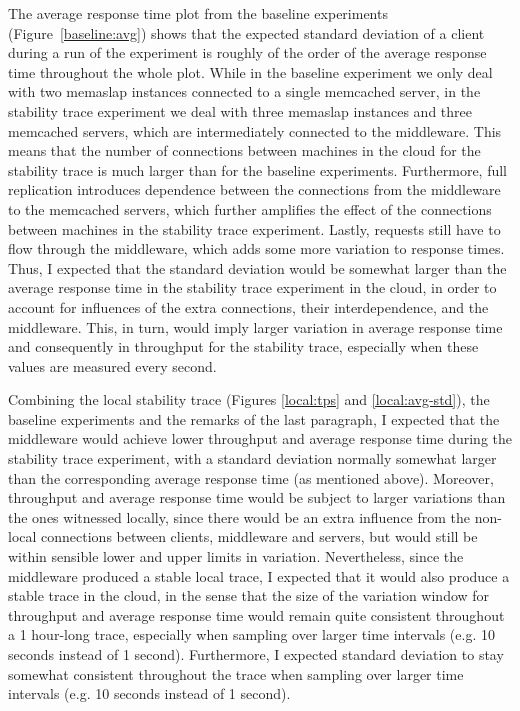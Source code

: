 \documentclass[11pt]{article}
\begin{document}
The average response time plot from the baseline experiments (Figure~\ref{baseline:avg}) shows that the expected standard deviation of a client during a run of the experiment is roughly of the order of the average response time throughout the whole plot. While in the baseline experiment we only deal with two memaslap instances connected to a single memcached server, in the stability trace experiment we deal with three memaslap instances and three memcached servers, which are intermediately connected to the middleware. This means that the number of connections between machines in the cloud for the stability trace is much larger than for the baseline experiments. Furthermore, full replication introduces dependence between the connections from the middleware to the memcached servers, which further amplifies the effect of the connections between machines in the stability trace experiment. Lastly, requests still have to flow through the middleware, which adds some more variation to response times. Thus, I expected that the standard deviation would be somewhat larger than the average response time in the stability trace experiment in the cloud, in order to account for influences of the extra connections, their interdependence, and the middleware. This, in turn, would imply larger variation in average response time and consequently in throughput for the stability trace, especially when these values are measured every second.

Combining the local stability trace (Figures \ref{local:tps} and \ref{local:avg-std}), the baseline experiments and the remarks of the last paragraph, I expected that the middleware would achieve lower throughput and average response time during the stability trace experiment, with a standard deviation normally somewhat larger than the corresponding average response time (as mentioned above). Moreover, throughput and average response time would be subject to larger variations than the ones witnessed locally, since there would be an extra influence from the non-local connections between clients, middleware and servers, but would still be within sensible lower and upper limits in variation. Nevertheless, since the middleware produced a stable local trace, I expected that it would also produce a stable trace in the cloud,  in the sense that the size of the variation window for throughput and average response time would remain quite consistent throughout a 1 hour-long trace, especially when sampling over larger time intervals (e.g. 10 seconds instead of 1 second). Furthermore, I expected standard deviation to stay somewhat consistent throughout the trace when sampling over larger time intervals (e.g. 10 seconds instead of 1 second).
\end{document}
